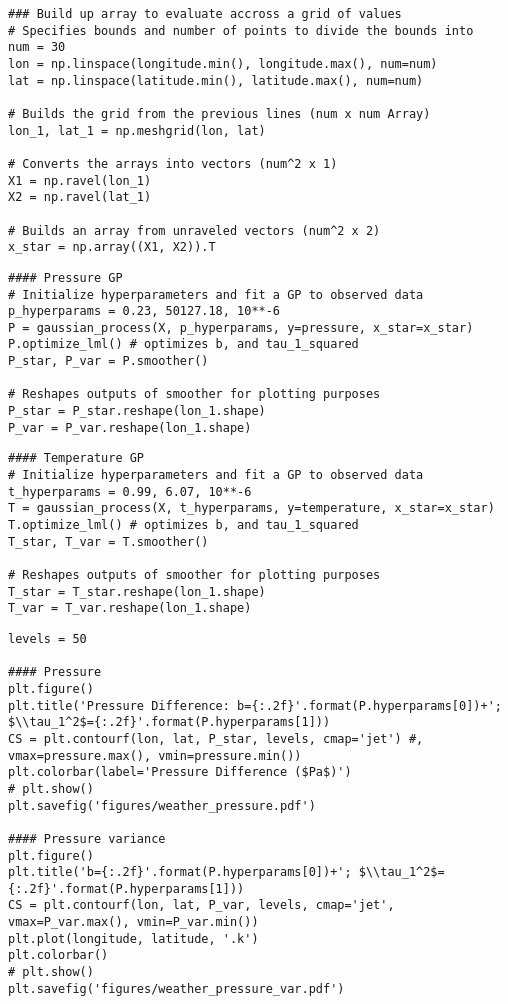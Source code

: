 \documentclass[10pt]{article}
\begin{document}
\begin{enumerate}[label=(\Alph*)]
        \begin{lstlisting}
### Build up array to evaluate accross a grid of values
# Specifies bounds and number of points to divide the bounds into
num = 30
lon = np.linspace(longitude.min(), longitude.max(), num=num)
lat = np.linspace(latitude.min(), latitude.max(), num=num)

# Builds the grid from the previous lines (num x num Array)
lon_1, lat_1 = np.meshgrid(lon, lat)

# Converts the arrays into vectors (num^2 x 1)
X1 = np.ravel(lon_1)
X2 = np.ravel(lat_1)

# Builds an array from unraveled vectors (num^2 x 2)
x_star = np.array((X1, X2)).T
        \end{lstlisting}

        \begin{lstlisting}
#### Pressure GP
# Initialize hyperparameters and fit a GP to observed data 
p_hyperparams = 0.23, 50127.18, 10**-6
P = gaussian_process(X, p_hyperparams, y=pressure, x_star=x_star)
P.optimize_lml() # optimizes b, and tau_1_squared
P_star, P_var = P.smoother()

# Reshapes outputs of smoother for plotting purposes
P_star = P_star.reshape(lon_1.shape)
P_var = P_var.reshape(lon_1.shape)
        \end{lstlisting}

        \begin{lstlisting}
#### Temperature GP
# Initialize hyperparameters and fit a GP to observed data 
t_hyperparams = 0.99, 6.07, 10**-6
T = gaussian_process(X, t_hyperparams, y=temperature, x_star=x_star)
T.optimize_lml() # optimizes b, and tau_1_squared
T_star, T_var = T.smoother()

# Reshapes outputs of smoother for plotting purposes
T_star = T_star.reshape(lon_1.shape)
T_var = T_var.reshape(lon_1.shape)
        \end{lstlisting}

        \begin{lstlisting}
levels = 50

#### Pressure
plt.figure()
plt.title('Pressure Difference: b={:.2f}'.format(P.hyperparams[0])+'; $\\tau_1^2$={:.2f}'.format(P.hyperparams[1]))
CS = plt.contourf(lon, lat, P_star, levels, cmap='jet') #, vmax=pressure.max(), vmin=pressure.min())
plt.colorbar(label='Pressure Difference ($Pa$)')
# plt.show()
plt.savefig('figures/weather_pressure.pdf')

#### Pressure variance
plt.figure()
plt.title('b={:.2f}'.format(P.hyperparams[0])+'; $\\tau_1^2$={:.2f}'.format(P.hyperparams[1]))
CS = plt.contourf(lon, lat, P_var, levels, cmap='jet', vmax=P_var.max(), vmin=P_var.min())
plt.plot(longitude, latitude, '.k')
plt.colorbar()
# plt.show()
plt.savefig('figures/weather_pressure_var.pdf')
        \end{lstlisting}


\end{enumerate}
\end{document}
